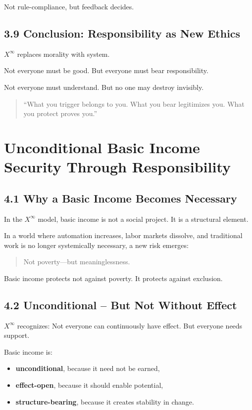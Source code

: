\documentclass[12pt,a4paper]{book}
\begin{document}
Not rule-compliance, but feedback decides.

\section*{3.9 Conclusion: Responsibility as New Ethics}

$X^\infty$ replaces morality with system.

Not everyone must be good.  
But everyone must bear responsibility.

Not everyone must understand.  
But no one may destroy invisibly.

\begin{quote}
“What you trigger belongs to you.  
What you bear legitimizes you.  
What you protect proves you.”  
\end{quote}

\chapter{Unconditional Basic Income\\Security Through Responsibility}

\section*{4.1 Why a Basic Income Becomes Necessary}

In the $X^\infty$ model, basic income is not a social project.  
It is a structural element.

In a world where automation increases, labor markets dissolve,  
and traditional work is no longer systemically necessary,  
a new risk emerges:

\begin{quote}
Not poverty—but meaninglessness.
\end{quote}

Basic income protects not against poverty.  
It protects against exclusion.

\section*{4.2 Unconditional – But Not Without Effect}

$X^\infty$ recognizes:  
Not everyone can continuously have effect. But everyone needs support.

Basic income is:

\begin{itemize}
  \item \textbf{unconditional}, because it need not be earned,
  \item \textbf{effect-open}, because it should enable potential,
  \item \textbf{structure-bearing}, because it creates stability in change.
\end{itemize}
\end{document}
